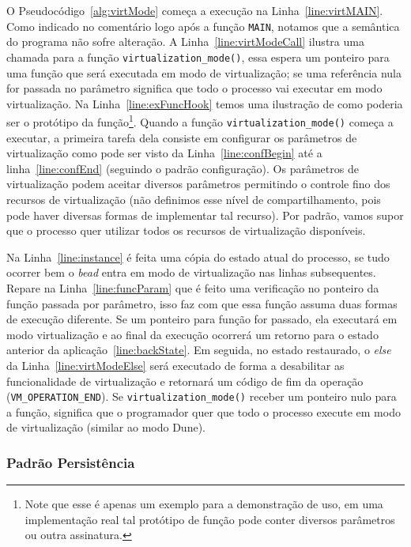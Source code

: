 

O Pseudocódigo~\ref{alg:virtMode} começa a execução na
Linha~\ref{line:virtMAIN}. Como indicado no comentário logo após a função
\texttt{MAIN}, notamos que a semântica do programa não sofre alteração. A
Linha~\ref{line:virtModeCall} ilustra uma chamada para a função
\texttt{virtualization\_mode()}, essa espera um ponteiro para uma função que
será executada em modo de virtualização; se uma referência nula for passada no
parâmetro significa que todo o processo vai executar em modo virtualização. Na
Linha~\ref{line:exFuncHook} temos uma ilustração de como poderia ser o
protótipo da função\footnote{Note que esse é apenas um exemplo para a
demonstração de uso, em uma implementação real tal protótipo de função pode
conter diversos parâmetros ou outra assinatura.}. Quando a função
\texttt{virtualization\_mode()} começa a executar, a primeira tarefa dela
consiste em configurar os parâmetros de virtualização como pode ser visto da
Linha~\ref{line:confBegin} até a linha~\ref{line:confEnd} (seguindo o padrão
configuração). Os parâmetros de virtualização podem aceitar diversos parâmetros
permitindo o controle fino dos recursos de virtualização (não definimos esse
nível de compartilhamento, pois pode haver diversas formas de implementar tal
recurso). Por padrão, vamos supor que o processo quer utilizar todos os
recursos de virtualização disponíveis.

Na Linha~\ref{line:instance} é feita uma cópia do estado atual do processo, se
tudo ocorrer bem o \emph{bead} entra em modo de virtualização nas linhas
subsequentes. Repare na Linha~\ref{line:funcParam} que é feito uma verificação
no ponteiro da função passada por parâmetro, isso faz com que essa função
assuma duas formas de execução diferente. Se um ponteiro para função for
passado, ela executará em modo virtualização e ao final da execução ocorrerá um
retorno para o estado anterior da aplicação~\ref{line:backState}. Em seguida,
no estado restaurado, o \emph{else} da Linha~\ref{line:virtModeElse} será
executado de forma a desabilitar as funcionalidade de virtualização e retornará
um código de fim da operação (\texttt{VM\_OPERATION\_END}). Se
\texttt{virtualization\_mode()} receber um ponteiro nulo para a função,
significa que o programador quer que todo o processo execute em modo de
virtualização (similar ao modo Dune).

\subsubsection{Padrão Persistência}

